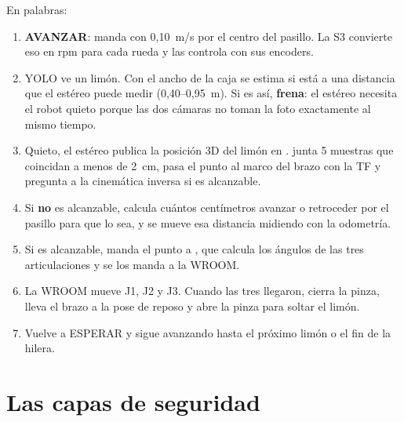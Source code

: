 En palabras:
\begin{enumerate}
  \item \textbf{AVANZAR}:  manda  con 0,10~m/s por el centro del pasillo. La S3
        convierte eso en rpm para cada rueda y las controla con sus encoders.
  \item YOLO ve un limón. Con el ancho de la caja se estima si está a una distancia que el estéreo puede medir
        (0,40--0,95~m). Si es así,  \textbf{frena}: el estéreo necesita el robot quieto porque las dos
        cámaras no toman la foto exactamente al mismo tiempo.
  \item Quieto, el estéreo publica la posición 3D del limón en .  junta 5
        muestras que coincidan a menos de 2~cm, pasa el punto al marco del brazo con la TF y pregunta a la
        cinemática inversa si es alcanzable.
  \item Si \textbf{no} es alcanzable,  calcula cuántos centímetros avanzar o retroceder por el
        pasillo para que lo sea, y se mueve esa distancia midiendo con la odometría.
  \item Si es alcanzable,  manda el punto a , que calcula los ángulos de las tres
        articulaciones y se los manda a la WROOM.
  \item La WROOM mueve J1, J2 y J3. Cuando las tres llegaron,  cierra la pinza, lleva el brazo a la
        pose de reposo y abre la pinza para soltar el limón.
  \item Vuelve a ESPERAR y  sigue avanzando hasta el próximo limón o el fin de la hilera.
\end{enumerate}

\section{Las capas de seguridad}

